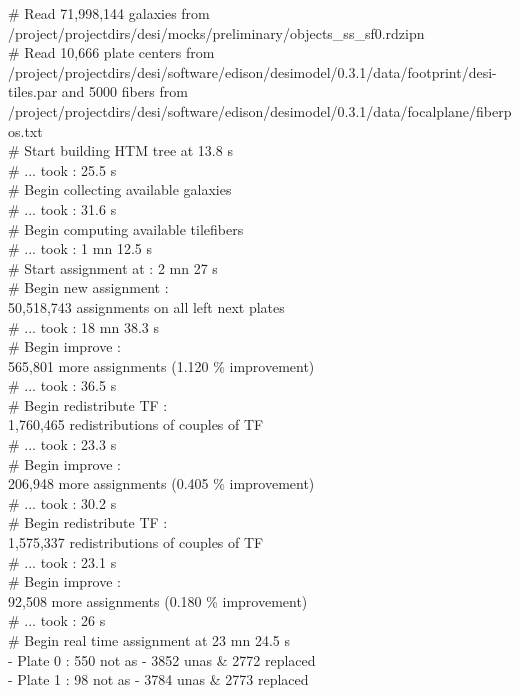 \documentclass{article}
\begin{document}
{\tt \small 

\# Read 71,998,144 galaxies from /project/projectdirs/desi/mocks/preliminary/objects\_ss\_sf0.rdzipn \\
\# Read 10,666 plate centers from /project/projectdirs/desi/software/edison/desimodel/0.3.1/data/footprint/desi-tiles.par and 
5000 fibers from /project/projectdirs/desi/software/edison/desimodel/0.3.1/data/focalplane/fiberpos.txt \\
\# Start building HTM tree at 13.8 s \\
\# ... took : 25.5 s \\
\# Begin collecting available galaxies \\
 \# ... took : 31.6 s \\
\# Begin computing available tilefibers \\
\# ... took : 1 mn 12.5 s \\
\# Start assignment at :  2 mn 27 s \\
\# Begin new assignment : \\
  50,518,743 assignments on all left next plates \\
\# ... took : 18 mn 38.3 s \\
\# Begin improve : \\
  565,801 more assignments (1.120 \% improvement) \\
\# ... took : 36.5 s \\
\# Begin redistribute TF : \\
  1,760,465 redistributions of couples of TF \\
\# ... took : 23.3 s \\
\# Begin improve : \\
  206,948 more assignments (0.405 \% improvement) \\
\# ... took : 30.2 s \\
\# Begin redistribute TF : \\
  1,575,337 redistributions of couples of TF \\
\# ... took : 23.1 s \\
\# Begin improve : \\
  92,508 more assignments (0.180 \% improvement) \\
\# ... took : 26 s \\
\# Begin real time assignment at 23 mn 24.5 s \\
 - Plate 0 :   550 not as -  3852 unas \& 2772 replaced \\
 - Plate 1 :    98 not as -  3784 unas \& 2773 replaced \\
}
\end{document}
